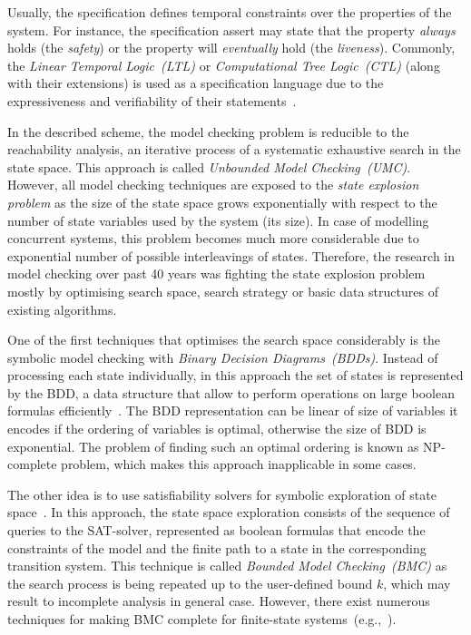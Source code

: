 Usually, the specification defines temporal constraints over the properties of the system.
For instance, the specification assert may state that the property \textit{always} holds (the \textit{safety}) or the property will \textit{eventually} hold (the \textit{liveness}).
Commonly, the \textit{Linear Temporal Logic~(LTL)} or \textit{Computational Tree Logic~(CTL)} (along with their extensions) is used as a specification language due to the expressiveness and verifiability of their statements~\cite{clarke1999model}.

In the described scheme, the model checking problem is reducible to the reachability analysis, an iterative process of a systematic exhaustive search in the state space.
This approach is called \textit{Unbounded Model Checking~(UMC)}.
However, all model checking techniques are exposed to the \textit{state explosion problem} as the size of the state space grows exponentially with respect to the number of state variables used by the system (its size).
In case of modelling concurrent systems, this problem becomes much more considerable due to exponential number of possible interleavings of states.
Therefore, the research in model checking over past 40 years was fighting the state explosion problem mostly by optimising search space, search strategy or basic data structures of existing algorithms.

One of the first techniques that optimises the search space considerably is the symbolic model checking with \textit{Binary Decision Diagrams~(BDDs)}.
Instead of processing each state individually, in this approach the set of states is represented by the BDD, a data structure that allow to perform operations on large boolean formulas efficiently~\cite{clarke2012model}.
The BDD representation can be linear of size of variables it encodes if the ordering of variables is optimal, otherwise the size of BDD is exponential.
The problem of finding such an optimal ordering is known as NP-complete problem, which makes this approach inapplicable in some cases.

The other idea is to use satisfiability solvers for symbolic exploration of state space~\cite{clarke2001bounded}.
In this approach, the state space exploration consists of the sequence of queries to the SAT-solver, represented as boolean formulas that encode the constraints of the model and the finite path to a state in the corresponding transition system.  
This technique is called \textit{Bounded Model Checking~(BMC)} as the search process is being repeated up to the user-defined bound $k$, which may result to incomplete analysis in general case.
However, there exist numerous techniques for making BMC complete for finite-state systems~(e.g.,~\cite{shtrichman2000tuning}).

